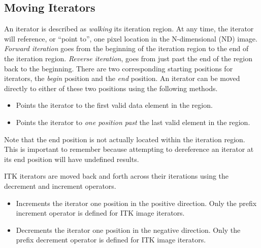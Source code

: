 \subsection{Moving Iterators}
\label{sec:MovingIterators}
An iterator is described as \emph{walking} its iteration region.  At any
time, the iterator will reference, or ``point to'', one pixel location in the
N-dimensional (ND) image.  \emph{Forward iteration} goes from the beginning
of the iteration region to the end of the iteration region.  \emph{Reverse
iteration}, goes from just past the end of the region back to the beginning.
There are two corresponding starting positions for iterators, the
\emph{begin} position and the \emph{end} position.  An iterator can be moved
directly to either of these two positions using the following methods.


\begin{itemize}
\item \textbf{} Points the iterator to the first valid
data element in the region.

\item \textbf{} Points the iterator to \emph{one position past}
the last valid element in the region.
\end{itemize}

Note that the end position is not actually located within the iteration region.  This is
important to remember because attempting to dereference an iterator at its end
position will have undefined results.

ITK iterators are moved back and forth across their iterations using the 
decrement and increment operators.

\begin{itemize}
\item \textbf{} Increments the iterator one position in the
positive direction.  Only the prefix increment operator is defined for ITK image
iterators.

\item \textbf{} Decrements the iterator one position in the
negative direction.  Only the prefix decrement operator is defined for ITK
image iterators. 
\end{itemize}

